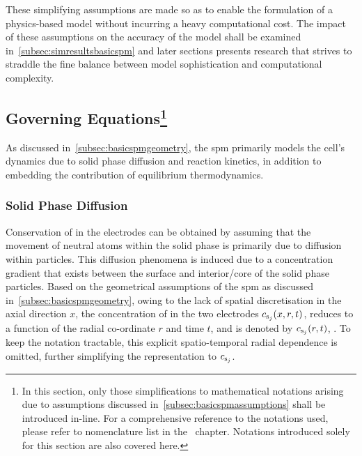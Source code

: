 These  simplifying assumptions  are  made so  as to  enable  the formulation  of
a  physics-based  model  without  incurring  a  heavy  computational  cost.  The
impact  of these  assumptions on  the accuracy  of the  model shall  be examined
in~\cref{subsec:simresultsbasicspm}  and later  sections presents  research that
strives  to  straddle   the  fine  balance  between   model  sophistication  and
computational complexity.


\subsection[Governing  Equations]{Governing  Equations\protect\footnote{In  this
section,   only  those   simplifications  to   mathematical  notations   arising
due  to  assumptions  discussed  in~\cref{subsec:basicspmassumptions}  shall  be
introduced   in-line.   For  a   comprehensive   reference   to  the   notations
used,   please  refer   to   nomenclature   list  in   the~
chapter.  Notations  introduced  solely  for   this  section  are  also  covered
here.}}\label{subsec:basicspmgoverningeqns}


As discussed  in~\cref{subsec:basicspmgeometry}, the \gls{spm}  primarily models
the  cell's dynamics  due to  solid phase  diffusion and  reaction kinetics,  in
addition to embedding the contribution of equilibrium thermodynamics.

\subsubsection*{Solid Phase Diffusion}

Conservation of  in the electrodes can be obtained by assuming that the
movement of neutral  atoms within the solid phase is  primarily due to diffusion
within particles.  This diffusion  phenomena is induced  due to  a concentration
gradient  that  exists  between  the  surface and  interior/core  of  the  solid
phase  particles. Based  on  the  geometrical assumptions  of  the \gls{spm}  as
discussed in~\cref{subsec:basicspmgeometry}, \ie{} owing  to the lack of spatial
discretisation in the axial direction $x$, the concentration of  in the
two electrodes $c_{{\text{s}_j}}(x,r,t)$,  reduces to a function of  the radial co-ordinate
$r$ and  time $t$,  and is  denoted by $c_{{\text{s}_j}}(r,t)$,  \jinnegpos{}. To  keep the
notation tractable, this explicit  spatio-temporal radial dependence is omitted,
further simplifying the representation to $c_{{\text{s}_j}}$.

